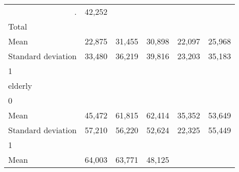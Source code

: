 \begin{tabular}{llllll}
  \multicolumn{1}{r}{.} &
  \multicolumn{1}{r}{42,252} \\
\multicolumn{1}{l}{\hspace{3em}Total} &
  \multicolumn{1}{|r}{} &
  \multicolumn{1}{r}{} &
  \multicolumn{1}{r}{} &
  \multicolumn{1}{r}{} &
  \multicolumn{1}{r}{} \\
\multicolumn{1}{l}{\hspace{4em}Mean} &
  \multicolumn{1}{|r}{22,875} &
  \multicolumn{1}{r}{31,455} &
  \multicolumn{1}{r}{30,898} &
  \multicolumn{1}{r}{22,097} &
  \multicolumn{1}{r}{25,968} \\
\multicolumn{1}{l}{\hspace{4em}Standard deviation} &
  \multicolumn{1}{|r}{33,480} &
  \multicolumn{1}{r}{36,219} &
  \multicolumn{1}{r}{39,816} &
  \multicolumn{1}{r}{23,203} &
  \multicolumn{1}{r}{35,183} \\
\multicolumn{1}{l}{\hspace{1em}1} &
  \multicolumn{1}{|r}{} &
  \multicolumn{1}{r}{} &
  \multicolumn{1}{r}{} &
  \multicolumn{1}{r}{} &
  \multicolumn{1}{r}{} \\
\multicolumn{1}{l}{\hspace{2em}elderly} &
  \multicolumn{1}{|r}{} &
  \multicolumn{1}{r}{} &
  \multicolumn{1}{r}{} &
  \multicolumn{1}{r}{} &
  \multicolumn{1}{r}{} \\
\multicolumn{1}{l}{\hspace{3em}0} &
  \multicolumn{1}{|r}{} &
  \multicolumn{1}{r}{} &
  \multicolumn{1}{r}{} &
  \multicolumn{1}{r}{} &
  \multicolumn{1}{r}{} \\
\multicolumn{1}{l}{\hspace{4em}Mean} &
  \multicolumn{1}{|r}{45,472} &
  \multicolumn{1}{r}{61,815} &
  \multicolumn{1}{r}{62,414} &
  \multicolumn{1}{r}{35,352} &
  \multicolumn{1}{r}{53,649} \\
\multicolumn{1}{l}{\hspace{4em}Standard deviation} &
  \multicolumn{1}{|r}{57,210} &
  \multicolumn{1}{r}{56,220} &
  \multicolumn{1}{r}{52,624} &
  \multicolumn{1}{r}{22,325} &
  \multicolumn{1}{r}{55,449} \\
\multicolumn{1}{l}{\hspace{3em}1} &
  \multicolumn{1}{|r}{} &
  \multicolumn{1}{r}{} &
  \multicolumn{1}{r}{} &
  \multicolumn{1}{r}{} &
  \multicolumn{1}{r}{} \\
\multicolumn{1}{l}{\hspace{4em}Mean} &
  \multicolumn{1}{|r}{64,003} &
  \multicolumn{1}{r}{63,771} &
  \multicolumn{1}{r}{48,125} &

\end{tabular}
